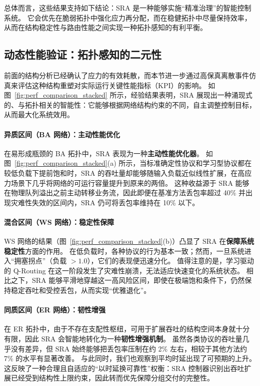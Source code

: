 \documentclass[journal]{IEEEtran}
\theoremstyle{plain}
\theoremstyle{definition}
\begin{document}
总体而言，这些结果支持如下结论：SRA 是一种能够实施“精准治理”的智能控制系统。
它会优先在脆弱拓扑中强化应力再分配，而在稳健拓扑中尽量保持效率，从而在结构稳定性与路由性能之间实现一种拓扑感知的有利平衡。

\subsection{动态性能验证：拓扑感知的二元性}
\label{subsec:dynamic_performance}

前面的结构分析已经确认了应力的有效耗散，而本节进一步通过高保真离散事件仿真来评估这种结构重塑对实际运行关键性能指标（KPI）的影响。
如图~\ref{fig:perf_comparison_stacked} 所示，经验结果表明，SRA 展现出一种涌现式的、与拓扑相关的智能性：它能够根据网络结构约束的不同，自主调整控制目标，从而最大化系统效用。

\paragraph{异质区间（BA 网络）：主动性能优化}
在易形成瓶颈的 BA 拓扑中，SRA 表现为一种\textbf{主动性能优化器}。
如图~\ref{fig:perf_comparison_stacked}(a) 所示，当标准确定性协议和学习型协议都在较低负载下提前饱和时，SRA 的吞吐量却能够随输入负载近似线性扩展，在高应力场景下几乎将网络的可运行容量提升到原来的两倍。
这种收益源于 SRA 能够在物理队列溢出之前主动转移业务流，因此即便在基准方法丢包率超过 40\% 并出现灾难性失效的区间内，SRA 仍可将丢包率维持在 10\% 以下。

\paragraph{混合区间（WS 网络）：稳定性保障}
WS 网络的结果（图~\ref{fig:perf_comparison_stacked}(b)）凸显了 SRA 在\textbf{保障系统稳定性}方面的作用。
在低负载时，各种协议的行为基本一致；然而，一旦系统进入“拥塞拐点”（负载 $> 1.0$），它们的表现便迅速分化。
值得注意的是，学习驱动的 Q-Routing 在这一阶段发生了灾难性崩溃，无法适应快速变化的系统状态。
相比之下，SRA 能够平滑地穿越这一高风险区间，即使在极端饱和条件下，仍然保持稳定吞吐和受控丢包，从而实现“优雅退化”。

\paragraph{同质区间（ER 网络）：韧性增强}
在 ER 拓扑中，由于不存在支配性枢纽，可用于扩展吞吐的结构空间本身就十分有限，因此 SRA 会智能地转化为一种\textbf{韧性增强机制}。
虽然各类协议的吞吐量几乎没有差异，但 SRA 始终能够把丢包率压制在约 2\% 左右，相较于其他方法约 7\% 的水平有显著改善。
与此同时，我们也观察到平均时延出现了可预期的上升。
这反映了一种合理且自适应的“以时延换可靠性”权衡：SRA 控制器识别出吞吐扩展已经受到结构性上限约束，因此转而优先保障分组交付的完整性。
\end{document}
